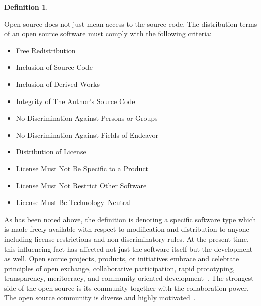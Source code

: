 \documentclass[11pt,a4paper]{article}
\theoremstyle{definition}
\newtheorem{definition}{Definition}[section]
\begin{document}
    \begin{definition}
        \cite{BOOK:open-source-def, WP:opensource-osd, WP:opensource-debian}\\[-5mm]
        \begin{center}
            \begin{minipage}{0.9\textwidth}
                Open source does not just mean access to the source code. The distribution terms of an open source software must comply with the following criteria:\\[-7mm]
                \begin{itemize}
                    \item Free Redistribution\\[-7mm]
                    \item Inclusion of Source Code\\[-7mm]
                    \item Inclusion of Derived Works\\[-7mm]
                    \item Integrity of The Author's Source Code\\[-7mm]
                    \item No Discrimination Against Persons or Groups\\[-7mm]
                    \item No Discrimination Against Fields of Endeavor\\[-7mm]
                    \item Distribution of License\\[-7mm]
                    \item License Must Not Be Specific to a Product\\[-7mm]
                    \item License Must Not Restrict Other Software\\[-7mm]
                    \item License Must Be Technology--Neutral\\
                \end{itemize}
            \end{minipage}
        \end{center}
    \end{definition}

    As has been noted above, the definition is denoting a specific software type which is made freely available with respect to modification and distribution to anyone including license restrictions and non-discriminatory rules. At the present time, this influencing fact has affected not just the software itself but the development as well. Open source projects, products, or initiatives embrace and celebrate principles of open exchange, collaborative participation, rapid prototyping, transparency, meritocracy, and community-oriented development~\cite{WP:what-is-os}. The strongest side of the open source is its community together with the collaboration power. The open source community is diverse and highly motivated~\cite{WP:opensource-com}.\\
\end{document}
